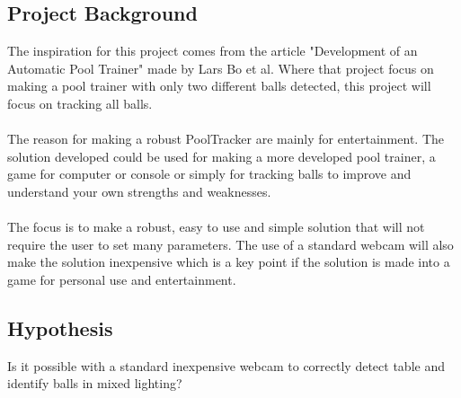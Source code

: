 \subsection{Project Background}
The inspiration for this project comes from the article "Development of an Automatic Pool Trainer"\cite{larsbopool} made by Lars Bo et al. Where that project focus on making a pool trainer with only two different balls detected, this project will focus on tracking all balls. 
\\\\
The reason for making a robust PoolTracker are mainly for entertainment. The solution developed could be used for making a more developed pool trainer, a game for computer or console or simply for tracking balls to improve and understand your own strengths and weaknesses.
\\\\
The focus is to make a robust, easy to use and simple solution that will not require the user to set many parameters. The use of a standard webcam will also make the solution inexpensive which is a key point if the solution is made into a game for personal use and entertainment.

\subsection{Hypothesis}
Is it possible with a standard inexpensive webcam to correctly detect table and identify balls in mixed lighting?
